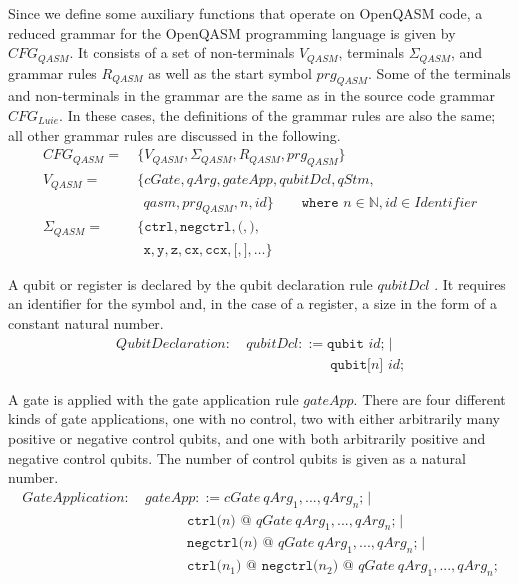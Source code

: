 Since we define some auxiliary functions that operate on OpenQASM code, a reduced grammar for the OpenQASM programming language is given by $CFG_{QASM}$. It consists of a set of non-terminals $V_{QASM}$, terminals $\Sigma_{QASM}$, and grammar rules $R_{QASM}$ as well as the start symbol $prg_{QASM}$. Some of the terminals and non-terminals in the grammar are the same as in the source code grammar $CFG_{Luie}$. In these cases, the definitions of the grammar rules are also the same; all other grammar rules are discussed in the following.
\begin{align*}
    CFG_{QASM} = \ & \{V_{QASM}, \Sigma_{QASM}, R_{QASM}, prg_{QASM} \}\\ 
    V_{QASM} = \ & \{ cGate, qArg, gateApp, qubitDcl, qStm,\\ 
            & \ \  qasm, prg_{QASM}, n, id \}  \quad \quad \texttt{where } n \in \mathbb{N}, id \in Identifier\\ 
    \Sigma_{QASM} = \ & \{\texttt{ctrl}, \texttt{negctrl}, \texttt{(}, \texttt{)}, \\
               & \ \ \texttt{x}, \texttt{y}, \texttt{z}, \texttt{cx}, \texttt{ccx}, \texttt{[}, \texttt{]}, \dots \}
\end{align*}

A qubit or register is declared by the qubit declaration rule $qubitDcl$ . It requires an identifier for the symbol and, in the case of a register, a size in the form of a constant natural number. 
\begin{align*}
    QubitDeclaration: \ & qubitDcl::= \texttt{qubit } id \texttt{;} \mid\\
    & \hspace{6em} \texttt{qubit[}n\texttt{] } id \texttt{;}
\end{align*}

A gate is applied with the gate application rule $gateApp$. There are four different kinds of gate applications, one with no control, two with either arbitrarily many positive or negative control qubits, and one with both arbitrarily positive and negative control qubits. The number of control qubits is given as a natural number. 
\begin{align*}
GateApplication: \ & gateApp::= cGate \ qArg_1, ..., qArg_n \texttt{;} \mid\\
& \quad \quad \quad \texttt{ctrl(}n\texttt{)} \texttt{ @ } qGate \ qArg_1, ..., qArg_n \texttt{;} \mid\\
& \quad \quad \quad \texttt{negctrl(}n\texttt{)} \texttt{ @ } qGate \ qArg_1, ..., qArg_n \texttt{;} \mid\\
    & \quad \quad \quad \texttt{ctrl(}n_1\texttt{)} \texttt{ @ } \texttt{negctrl(}n_2\texttt{)} \texttt{ @ } qGate \ qArg_1, ..., qArg_n \texttt{;}
\end{align*}

